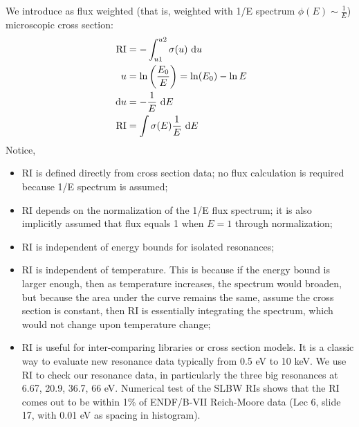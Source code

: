 \documentclass{school-22.211-notes}
\date{February 22, 2012}
\begin{document}
\maketitle

\clearpage
{}
We introduce  as flux weighted (that is, weighted with 1/E spectrum $\phi(E) \sim \frac{1}{E}$) microscopic cross section: 
\begin{align}
\mathrm{RI} &=  - \int_{u1}^{u2} \sigma(u) \mbox{ }\mathrm{d} u \\
u &= \ln \left( \frac{E_0}{E} \right) = \ln(E_0) - \ln E \\
\mbox{ }\mathrm{d} u &= - \frac{1}{E} \mbox{ }\mathrm{d} E \\ 
\mathrm{RI} &=  \int \sigma (E) \frac{1}{E} \mbox{ }\mathrm{d} E 
\end{align}
Notice, 
\begin{itemize}
\item RI is defined directly from cross section data; no flux calculation is required because 1/E spectrum is assumed; 
\item RI depends on the normalization of the 1/E flux spectrum; it is also implicitly assumed that flux equals 1 when $E = 1$ through normalization;
\item RI is independent of energy bounds for isolated resonances;
\item RI is independent of temperature. This is because if the energy bound is larger enough, then as temperature increases, the spectrum would broaden, but because the area under the curve remains the same, assume the cross section is constant, then RI is essentially integrating the spectrum, which would not change upon temperature change;
\item RI is useful for inter-comparing libraries or cross section models. It is a classic way to evaluate new resonance data typically from 0.5 eV to 10 keV. We use RI to check our resonance data, in particularly the three big resonances at 6.67, 20.9, 36.7, 66 eV. Numerical test of the SLBW RIs shows that the RI comes out to be within 1\% of ENDF/B-VII Reich-Moore data (Lec 6, slide 17, with 0.01 eV as spacing in histogram). 
\end{itemize}
\end{document}
